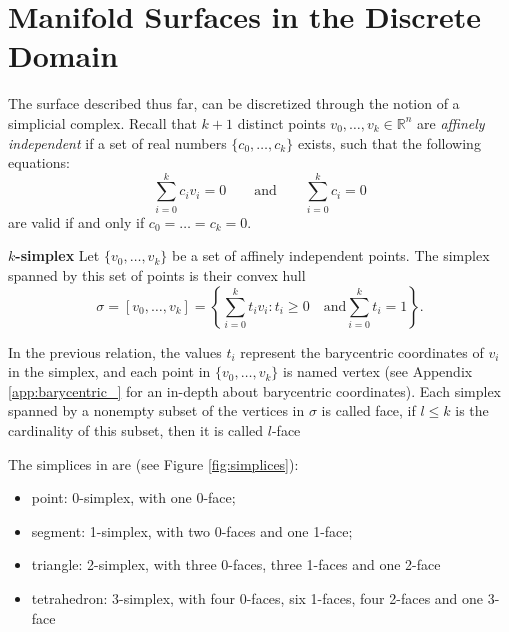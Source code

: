 
\section{Manifold Surfaces in the Discrete Domain}
The surface described thus far, can be discretized through the notion of a simplicial complex.
Recall that $k + 1$ distinct points $v_0, \dots, v_k \in \mathbb{R}^n$ are \emph{affinely independent} if a set of real numbers $\{c_0, \dots, c_k \}$ exists, such that the following equations:
\[
\sum_{i=0}^k{c_i v_i} = 0 \qquad \text{and} \qquad \sum_{i=0}^k{c_i} = 0
\]
are valid if and only if   $c_0 = \dots = c_k = 0$. 


\begin{mydef}
 \textbf{$k$-simplex}  
 Let $\{v_0, \dots, v_k\}$ be a set of affinely independent points. The simplex spanned by this set of points is their convex hull
 \[
 \sigma = [v_0, \dots, v_k] = \left\{ \sum_{i=0}^{k}{t_i v_i} : t_i \geq 0 \quad \text{and}  \sum_{i=0}^{k}{t_i} = 1\right\}.
 \]
\end{mydef}
In the previous relation, the values $t_i$ represent the barycentric coordinates of $v_i$ in the simplex, and each point in $\{v_0, \dots, v_k\}$ is named vertex (see Appendix \ref{app:barycentric_} for an in-depth about barycentric coordinates).
Each simplex spanned by a nonempty subset of the vertices in $\sigma$ is called face, if $l\leq k$ is the cardinality of this subset, then it is called $l$-face

The simplices in \Rthree are (see Figure \ref{fig:simplices}):
\begin{itemize}
  \item point: 0-simplex, with one 0-face;
  \item segment: 1-simplex, with two 0-faces and one 1-face;
  \item triangle: 2-simplex, with three 0-faces, three 1-faces and one 2-face
  \item tetrahedron: 3-simplex, with four 0-faces, six 1-faces, four 2-faces and one 3-face
\end{itemize}

